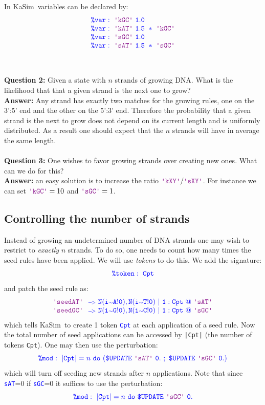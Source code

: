 \documentclass[11pt]{article}
\makeatletter
\def\ks{{\sc KaSim}}
\def\ttt#1{\texttt{\textcolor{blue}{#1}}}
\def\mtt#1{{\tt{\color{blue} #1}}}
\def\lab#1{\hbox{\ttt{\color{Plum}\textquotesingle #1\textquotesingle}}}
\def\int{{\scriptstyle\sim}}
\def\mod{\hbox{\tt\$}}
\def\Krule#1#2#3{\color{blue}\mtt{{\color{blue}\lab{#1}\ #2\ @\ #3}}}
\def\Kadec#1#2{\color{blue}\mtt{\hbox{\color{blue}\tt\%}#1:\ #2}}
\def\Kar{\ {\scriptstyle\tt-\! >}\ }
\makeatother
\begin{document}
In \ks~variables can be declared by:
$$
\begin{array}{l}
\Kadec{var}{\lab{kGC}\ 1.0} \\
\Kadec{var}{\lab{kAT}\ 1.5\ *\ \lab{kGC}} \\
\Kadec{var}{\lab{sGC}\ 1.0} \\
\Kadec{var}{\lab {sAT}\ 1.5\ *\ \lab{sGC}} \\
\end{array}
$$
\\\\ \textbf{Question 2:} Given a state with $n$ strands of growing DNA. What is the likelihood that that a given strand is the next one to grow? 
\\\textbf{Answer:} Any strand has exactly two matches for the growing rules, one on the 3':5' end and the other on the 5':3' end. Therefore the probability that a given strand is the next to grow does not depend on its current length and is uniformly distributed. As a result one should expect that the $n$ strands will have in average the same length.
\\\\ \textbf{Question 3:} One wishes to favor growing strands over creating new ones. What can we do for this?
\\\textbf{Answer:} an easy solution is to increase the ratio $\lab{kXY}/\lab{sXY}$. For instance we can set $\lab{kGC}=10$ and $\lab{sGC}=1$.

\subsection{Controlling the number of strands}

Instead of growing an undetermined number of DNA strands one may wish to restrict to \emph{exactly} $n$ strands. To do so, one needs to count how many times the seed rules have been applied. We will use \emph{tokens} to do this. We add the signature:
$$
\Kadec{token}{Cpt}
$$ 
and patch the seed rule as:
$$
\begin{array}{l}
\Krule{seedAT}{\Kar N(i\int A!0),N(i\int T!0)\ |\ 1:Cpt}{\lab{sAT}}\\
\Krule{seedGC}{\Kar N(i\int G!0),N(i\int C!0)\ |\ 1:Cpt}{\lab{sGC}}
\end{array}
$$
which tells \ks~to create 1 token \ttt{Cpt} at each application of a seed rule. Now the total number of seed applications can be accessed by \texttt{|Cpt|} (the number of tokens \texttt{Cpt}). One may then use the perturbation:
$$
\Kadec{mod}{|Cpt|=\hbox{$n$}\ do\ (\mod{UPDATE}\ \lab{sAT}\ 0.\ ;\ \mod{UPDATE}\ \lab{sGC}\ 0.)}
$$
which will turn off seeding new strands after $n$ applications. Note that since \lab{sAT}=0 if \lab{sGC}=0 it suffices to use the perturbation:
$$
\Kadec{mod}{|Cpt|=\hbox{$n$}\ do\ \mod{UPDATE}\ \lab{sGC}\ 0.}
$$
\end{document}
